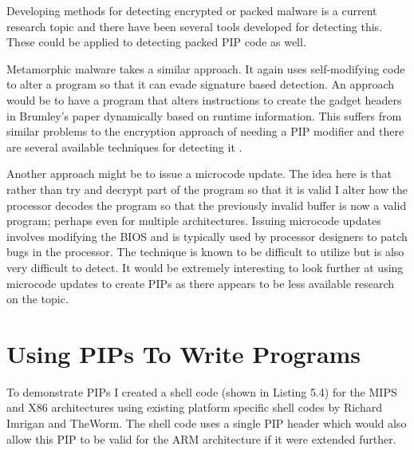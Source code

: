 \documentclass[10pt,]{book}
\begin{document}
Developing methods for detecting encrypted or packed malware is a
current research topic and there have been several tools developed for
detecting this\autocite{Chouchane:2006cf}\autocite{Zhang:2007jy}. These
could be applied to detecting packed PIP code as well.

Metamorphic malware\autocite{Sikorski:2011ua} takes a similar approach.
It again uses self-modifying code to alter a program so that it can
evade signature based detection. An approach would be to have a program
that alters instructions to create the gadget headers in Brumley's
paper\autocite{Cha:2010uh} dynamically based on runtime information.
This suffers from similar problems to the encryption approach of needing
a PIP modifier and there are several available techniques for detecting
it \autocite{Han:2011iu}\autocite{Ali:2011do}.

Another approach might be to issue a microcode
update\autocite{Smotherman:2010wr}. The idea here is that rather than
try and decrypt part of the program so that it is valid I alter how the
processor decodes the program so that the previously invalid buffer is
now a valid program; perhaps even for multiple architectures. Issuing
microcode updates involves modifying the BIOS and is typically used by
processor designers to patch bugs in the processor. The technique is
known to be difficult to utilize\autocite{Skoudis:2004to} but is also
very difficult to detect. It would be extremely interesting to look
further at using microcode updates to create PIPs as there appears to be
less available research on the topic.

\section{Using PIPs To Write Programs}

To demonstrate PIPs I created a shell code (shown in Listing 5.4) for
the MIPS and X86 architectures using existing platform specific shell
codes by Richard Imrigan\autocite{Imrigan:vg} and
TheWorm\autocite{TheWorm:vp}. The shell code uses a single PIP header
which would also allow this PIP to be valid for the ARM architecture if
it were extended further.
\end{document}
